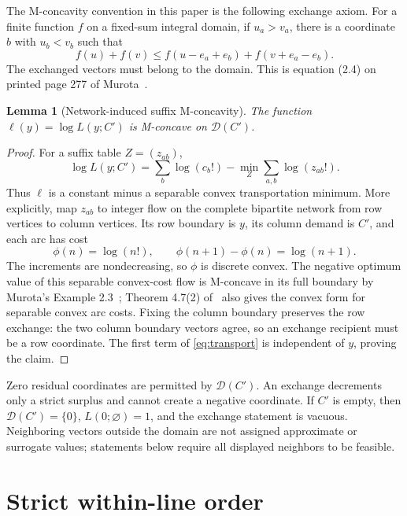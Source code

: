 \documentclass[10pt]{article}
\newtheorem{lemma}{Lemma}
\begin{document}
The M-concavity convention in this paper is the following exchange
axiom.  For a finite function \(f\) on a fixed-sum integral domain, if
\(u_a>v_a\), there is a coordinate \(b\) with \(u_b<v_b\) such that
\begin{equation*}
 f(u)+f(v)\le
 f(u-e_a+e_b)+f(v+e_a-e_b).
 \tag{EXC}
\end{equation*}
The exchanged vectors must belong to the domain.  This is equation
(2.4) on printed page 277 of Murota~\cite{murota1996}.

\begin{lemma}[Network-induced suffix M-concavity]
\label{lem:suffix}
The function \(\ell(y)=\log L(y;C')\) is M-concave on
\(\mathcal D(C')\).
\end{lemma}

\begin{proof}
For a suffix table \(Z=(z_{ab})\),
\begin{equation}
 \log L(y;C')=
 \sum_b\log(c_b!)
 -\min_Z\sum_{a,b}\log(z_{ab}!).
 \label{eq:transport}
\end{equation}
Thus \(\ell\) is a constant minus a separable convex transportation
minimum.  More explicitly, map \(z_{ab}\) to integer flow on the
complete bipartite network from row vertices to column vertices.  Its
row boundary is \(y\), its column demand is \(C'\), and each arc has
cost
\[
 \phi(n)=\log(n!),\qquad
 \phi(n+1)-\phi(n)=\log(n+1).
\]
The increments are nondecreasing, so \(\phi\) is discrete convex.
The negative optimum value of this separable convex-cost flow is
M-concave in its full boundary by Murota's Example 2.3~\cite{murota1996};
Theorem 4.7(2) of~\cite{murota2021} also gives the convex form for
separable convex arc costs. Fixing the column boundary preserves the
row exchange: the two column boundary vectors agree, so an exchange
recipient must be a row coordinate.  The first term
of \eqref{eq:transport} is independent of \(y\), proving the claim.
\end{proof}

Zero residual coordinates are permitted by \(\mathcal D(C')\).
An exchange decrements only a strict surplus and cannot create a
negative coordinate.  If \(C'\) is empty, then
\(\mathcal D(C')=\{0\}\), \(L(0;\varnothing)=1\), and the exchange
statement is vacuous.  Neighboring vectors outside the domain are not
assigned approximate or surrogate values; statements below require all
displayed neighbors to be feasible.

\section{Strict within-line order}
\end{document}
